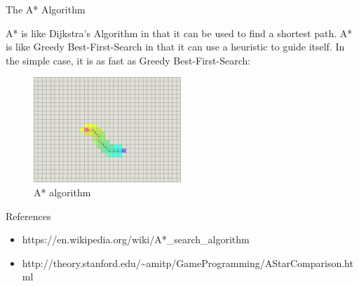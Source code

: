 \documentclass[ignorenonframetext,]{beamer}
\providecommand{\tightlist}{%
  \setlength{\itemsep}{0pt}\setlength{\parskip}{0pt}}
\begin{document}
\begin{frame}{The A* Algorithm}
\protect\hypertarget{the-a-algorithm}{}

A* is like Dijkstra's Algorithm in that it can be used to find a
shortest path. A* is like Greedy Best-First-Search in that it can use a
heuristic to guide itself. In the simple case, it is as fast as Greedy
Best-First-Search:

\begin{figure}
\centering
\includegraphics[width=\textwidth,height=1.5625in]{a-star.png}
\caption{A* algorithm}
\end{figure}

\end{frame}

\begin{frame}{References}
\protect\hypertarget{references}{}

\begin{itemize}
\tightlist
\item
  https://en.wikipedia.org/wiki/A*\_search\_algorithm
\item
  http://theory.stanford.edu/\textasciitilde{}amitp/GameProgramming/AStarComparison.html
\end{itemize}

\end{frame}
\end{document}
